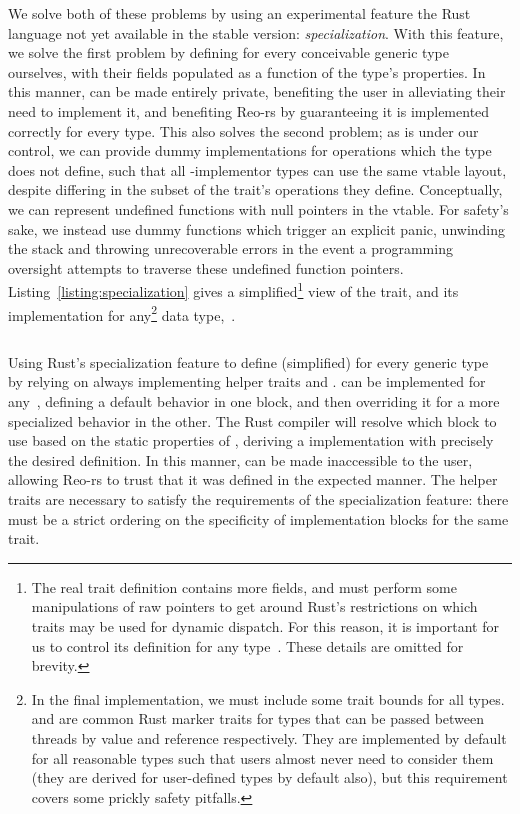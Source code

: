 We solve both of these problems by using an experimental feature the Rust language not yet available in the stable version: \textit{specialization}. With this feature, we solve the first problem by defining  for every conceivable generic type ourselves, with their fields populated as a function of the type's properties. In this manner,  can be made entirely private, benefiting the user in alleviating their need to implement it, and benefiting Reo-rs by guaranteeing it is implemented correctly for every type. This also solves the second problem; as  is under our control, we can provide dummy implementations for operations which the type does not define, such that all -implementor types can use the same vtable layout, despite differing in the subset of the trait's operations they define. Conceptually, we can represent undefined functions with null pointers in the vtable. For safety's sake, we instead use dummy functions which trigger an explicit panic, unwinding the stack and throwing unrecoverable errors in the event a programming oversight attempts to traverse these undefined function pointers. Listing~\ref{listing:specialization} gives a simplified\footnote{The real trait definition contains more fields, and must perform some manipulations of raw pointers to get around Rust's restrictions on which traits may be used for dynamic dispatch. For this reason, it is important for us to control its definition for any type~. These details are omitted for brevity.} view of the  trait, and its implementation for any\footnote{In the final implementation, we must include some trait bounds for all  types.  and  are common Rust marker traits for types that can be passed between threads by value and reference respectively. They are implemented by default for all reasonable types such that users almost never need to consider them~\cite{klabnik2018rust} (they are derived for user-defined types by default also), but this requirement covers some prickly safety pitfalls.} data type,~.

\begin{listing}[ht]
	\centering
	\inputminted{rust}{specialization.rs}
	\caption[Rust specialization to implement traits.]{Using Rust's specialization feature to define  (simplified) for every generic type~ by relying on  always implementing helper traits  and .  can be implemented for any~, defining a default behavior in one block, and then overriding it for a more specialized behavior in the other. The Rust compiler will resolve which block to use based on the static properties of , deriving a  implementation with precisely the desired definition. In this manner,  can be made inaccessible to the user, allowing Reo-rs to trust that it was defined in the expected manner. The helper traits are necessary to satisfy the requirements of the specialization feature: there must be a strict ordering on the specificity of implementation blocks for the same trait.}
	\label{listing:specialization}
\end{listing}

